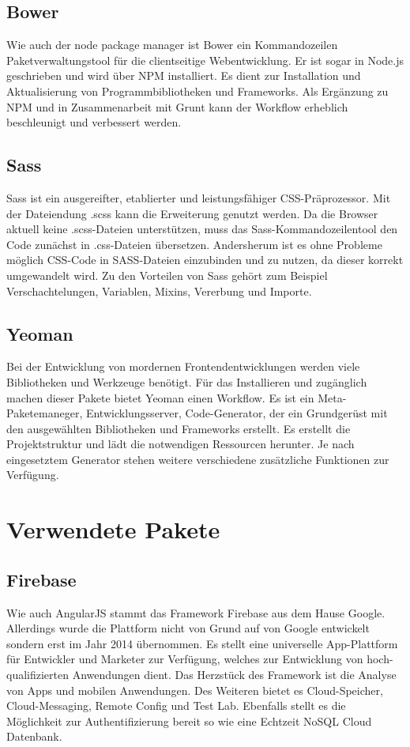 \subsection{Bower}
Wie auch der node package manager ist Bower ein Kommandozeilen Paketverwaltungstool für die clientseitige Webentwicklung. Er ist sogar in Node.js geschrieben und wird über NPM installiert. Es dient zur Installation und Aktualisierung von Programmbibliotheken und Frameworks. Als Ergänzung zu NPM und in Zusammenarbeit mit Grunt kann der Workflow erheblich beschleunigt und verbessert werden. 

\subsection{Sass}
Sass ist ein ausgereifter, etablierter und leistungsfähiger CSS-Präprozessor. Mit der Dateiendung .scss kann die Erweiterung genutzt werden. Da die Browser aktuell keine .scss-Dateien unterstützen, muss das Sass-Kommandozeilentool den Code zunächst in .css-Dateien übersetzen.  Andersherum ist es ohne Probleme möglich CSS-Code in SASS-Dateien einzubinden und zu nutzen, da dieser korrekt umgewandelt wird. Zu den Vorteilen von Sass gehört zum Beispiel Verschachtelungen, Variablen, Mixins, Vererbung und Importe.

\subsection{Yeoman}
Bei der Entwicklung von mordernen Frontendentwicklungen werden viele Bibliotheken und Werkzeuge benötigt. Für das Installieren und zugänglich machen dieser Pakete bietet Yeoman einen Workflow. Es ist ein Meta-Paketemaneger, Entwicklungsserver, Code-Generator, der ein Grundgerüst mit den ausgewählten Bibliotheken und Frameworks erstellt. Es erstellt die Projektstruktur und lädt die notwendigen Ressourcen herunter. Je nach eingesetztem Generator stehen weitere verschiedene zusätzliche Funktionen zur Verfügung. 

\section{Verwendete Pakete}
\subsection{Firebase}
Wie auch AngularJS stammt das Framework Firebase aus dem Hause Google. Allerdings wurde die Plattform nicht von Grund auf von Google entwickelt sondern erst im Jahr 2014 übernommen. Es stellt eine universelle App-Plattform für Entwickler und Marketer zur Verfügung, welches zur Entwicklung von hoch-qualifizierten Anwendungen dient. Das Herzstück des Framework ist die Analyse von Apps und mobilen Anwendungen. Des Weiteren bietet es Cloud-Speicher, Cloud-Messaging, Remote Config und Test Lab. Ebenfalls stellt es die Möglichkeit zur Authentifizierung bereit so wie eine Echtzeit NoSQL Cloud Datenbank. 

